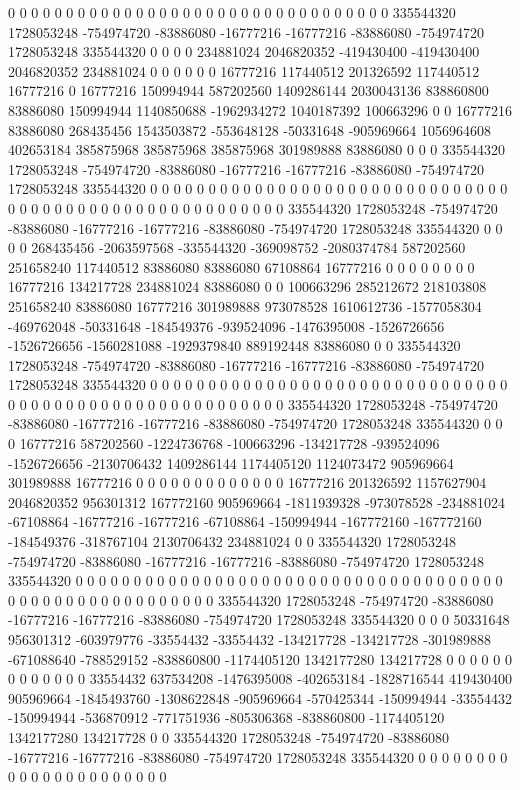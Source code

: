0 0 0 0 0 0 0 0 0 0 0 0 0 0 0 0 0 0 0 0 0 0 0 0 0 0 0 0 0 0 0 0 0 335544320 1728053248 -754974720 -83886080 -16777216 -16777216 -83886080 -754974720 1728053248 335544320 0 0 0 0 234881024 2046820352 -419430400 -419430400 2046820352 234881024 0 0 0 0 0 0 16777216 117440512 201326592 117440512 16777216 0 16777216 150994944 587202560 1409286144 2030043136 838860800 83886080 150994944 1140850688 -1962934272 1040187392 100663296 0 0 16777216 83886080 268435456 1543503872 -553648128 -50331648 -905969664 1056964608 402653184 385875968 385875968 385875968 301989888 83886080 0 0 0 335544320 1728053248 -754974720 -83886080 -16777216 -16777216 -83886080 -754974720 1728053248 335544320 0 0 0 0 0 0 0 0 0 0 0 0 0 0 0 0 0 0 0 0 0 0
0 0 0 0 0 0 0 0 0 0 0 0 0 0 0 0 0 0 0 0 0 0 0 0 0 0 0 0 0 0 0 0 0 335544320 1728053248 -754974720 -83886080 -16777216 -16777216 -83886080 -754974720 1728053248 335544320 0 0 0 0 268435456 -2063597568 -335544320 -369098752 -2080374784 587202560 251658240 117440512 83886080 83886080 67108864 16777216 0 0 0 0 0 0 0 0 16777216 134217728 234881024 83886080 0 0 100663296 285212672 218103808 251658240 83886080 16777216 301989888 973078528 1610612736 -1577058304 -469762048 -50331648 -184549376 -939524096 -1476395008 -1526726656 -1526726656 -1560281088 -1929379840 889192448 83886080 0 0 335544320 1728053248 -754974720 -83886080 -16777216 -16777216 -83886080 -754974720 1728053248 335544320 0 0 0 0 0 0 0 0 0 0 0 0 0 0 0 0 0 0 0 0 0 0
0 0 0 0 0 0 0 0 0 0 0 0 0 0 0 0 0 0 0 0 0 0 0 0 0 0 0 0 0 0 0 0 0 335544320 1728053248 -754974720 -83886080 -16777216 -16777216 -83886080 -754974720 1728053248 335544320 0 0 0 16777216 587202560 -1224736768 -100663296 -134217728 -939524096 -1526726656 -2130706432 1409286144 1174405120 1124073472 905969664 301989888 16777216 0 0 0 0 0 0 0 0 0 0 0 0 0 16777216 201326592 1157627904 2046820352 956301312 167772160 905969664 -1811939328 -973078528 -234881024 -67108864 -16777216 -16777216 -67108864 -150994944 -167772160 -167772160 -184549376 -318767104 2130706432 234881024 0 0 335544320 1728053248 -754974720 -83886080 -16777216 -16777216 -83886080 -754974720 1728053248 335544320 0 0 0 0 0 0 0 0 0 0 0 0 0 0 0 0 0 0 0 0 0 0
0 0 0 0 0 0 0 0 0 0 0 0 0 0 0 0 0 0 0 0 0 0 0 0 0 0 0 0 0 0 0 0 0 335544320 1728053248 -754974720 -83886080 -16777216 -16777216 -83886080 -754974720 1728053248 335544320 0 0 0 50331648 956301312 -603979776 -33554432 -33554432 -134217728 -134217728 -301989888 -671088640 -788529152 -838860800 -1174405120 1342177280 134217728 0 0 0 0 0 0 0 0 0 0 0 0 0 33554432 637534208 -1476395008 -402653184 -1828716544 419430400 905969664 -1845493760 -1308622848 -905969664 -570425344 -150994944 -33554432 -150994944 -536870912 -771751936 -805306368 -838860800 -1174405120 1342177280 134217728 0 0 335544320 1728053248 -754974720 -83886080 -16777216 -16777216 -83886080 -754974720 1728053248 335544320 0 0 0 0 0 0 0 0 0 0 0 0 0 0 0 0 0 0 0 0 0 0
